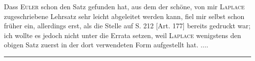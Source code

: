 Dass \textsc{Euler} schon den Satz gefunden hat, aus dem der schöne, von mir \textsc{Laplace} zugeschriebene Lehrsatz sehr leicht abgeleitet werden kann, fiel mir selbst schon früher ein, allerdings erst, als die Stelle auf S. 212 [Art. 177] bereits gedruckt war; ich wollte es jedoch nicht unter die Errata setzen, weil \textsc{Laplace} wenigstens den obigen Satz zuerst in der dort verwendeten Form aufgestellt hat. ....
\begin{center}\rule{.18\textwidth}{.35pt}\end{center}
